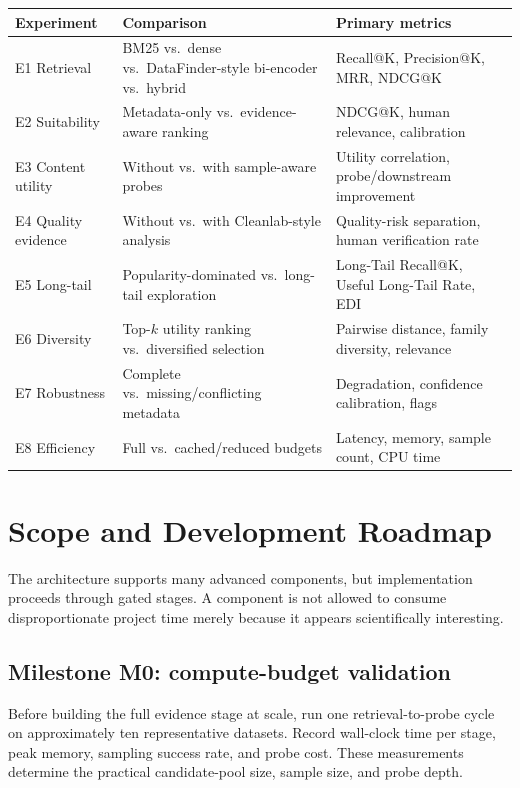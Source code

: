 \documentclass[11pt]{article}
\begin{document}
\begin{longtable}{@{}L{2.4cm}L{5.6cm}L{5.6cm}@{}}
\toprule
\textbf{Experiment} & \textbf{Comparison} & \textbf{Primary metrics} \\
\midrule
\endhead
E1 Retrieval & BM25 vs.\ dense vs.\ DataFinder-style bi-encoder vs.\ hybrid & Recall@K, Precision@K, MRR,
  NDCG@K \\
E2 Suitability & Metadata-only vs.\ evidence-aware ranking & NDCG@K, human relevance, calibration \\
E3 Content utility & Without vs.\ with sample-aware probes & Utility correlation, probe/downstream
  improvement \\
E4 Quality evidence & Without vs.\ with Cleanlab-style analysis & Quality-risk separation, human
  verification rate \\
E5 Long-tail & Popularity-dominated vs.\ long-tail exploration & Long-Tail Recall@K, Useful Long-Tail Rate,
  EDI \\
E6 Diversity & Top-$k$ utility ranking vs.\ diversified selection & Pairwise distance, family diversity,
  relevance \\
E7 Robustness & Complete vs.\ missing/conflicting metadata & Degradation, confidence calibration, flags \\
E8 Efficiency & Full vs.\ cached/reduced budgets & Latency, memory, sample count, CPU time \\
\bottomrule
\end{longtable}

\section{Scope and Development Roadmap}
The architecture supports many advanced components, but implementation proceeds through gated stages. A
component is not allowed to consume disproportionate project time merely because it appears scientifically
interesting.

\subsection{Milestone M0: compute-budget validation}
\label{sec:m0}
Before building the full evidence stage at scale, run one retrieval-to-probe cycle on approximately ten
representative datasets. Record wall-clock time per stage, peak memory, sampling success rate, and probe
cost. These measurements determine the practical candidate-pool size, sample size, and probe depth.
\end{document}
